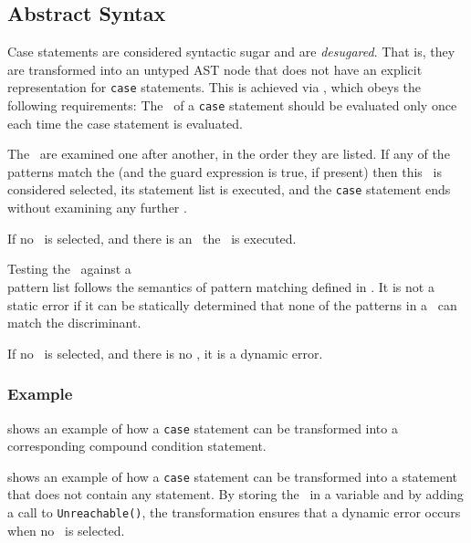 \subsection{Abstract Syntax}
Case statements are considered syntactic sugar and are \emph{desugared}.
That is, they are transformed into an untyped AST node that does not have
an explicit representation for \texttt{case} statements.
This is achieved via ,
which obeys the following requirements:
 The \casediscriminantterm\ of a \texttt{case}
statement should be evaluated only once each time the case statement is evaluated.

 The \casealternativesterm\ are examined
one after another, in the order they are listed.
If any of the patterns match the \casediscriminantterm (and the guard
expression is true, if present) then this \casealternativeterm\ is considered selected,
its statement list is executed, and the \texttt{case} statement ends without examining any further
\casealternativesterm.

 If no \casealternativeterm\ is selected, and there is an
\otherwisecaseterm\, the \otherwisecaseterm\ is executed.

 Testing the \casediscriminantterm\ against a \\
pattern list
follows the semantics of pattern matching defined in .
It is not a static error if it can be statically determined that none of the patterns in a
\casealternativeterm\ can match the discriminant.

 If no \casealternativeterm\ is selected,
and there is no \otherwisecaseterm, it is a dynamic error.

\subsubsection{Example}
 shows an example of how a \texttt{case} statement can be transformed into a corresponding
compound condition statement.

 shows an example of how a \texttt{case} statement can be transformed into
a statement that does not contain any  statement.
By storing the \casediscriminantterm\ in a variable and by adding
a call to \texttt{Unreachable()}, the transformation ensures that a dynamic error occurs when no
\casealternativeterm\ is selected.

